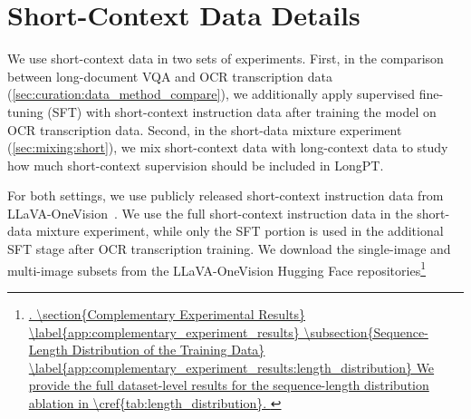 {{\section{Short-Context Data Details}
\label{app:short_context_data_details}
We use short-context data in two sets of experiments.
First, in the comparison between long-document VQA and OCR transcription data (\cref{sec:curation:data_method_compare}), we additionally apply supervised fine-tuning (SFT) with short-context instruction data after training the model on OCR transcription data.
Second, in the short-data mixture experiment (\cref{sec:mixing:short}), we mix short-context data with long-context data to study how much short-context supervision should be included in LongPT.

For both settings, we use publicly released short-context instruction data from LLaVA-OneVision~\citep{li2024llava}.
We use the full short-context instruction data in the short-data mixture experiment, while only the SFT portion is used in the additional SFT stage after OCR transcription training.
We download the single-image and multi-image subsets from the LLaVA-OneVision Hugging Face repositories\footnote{\url{.


\section{Complementary Experimental Results}
\label{app:complementary_experiment_results}

\subsection{Sequence-Length Distribution of the Training Data}
\label{app:complementary_experiment_results:length_distribution}
We provide the full dataset-level results for the sequence-length distribution ablation in \cref{tab:length_distribution}.

}}}}
